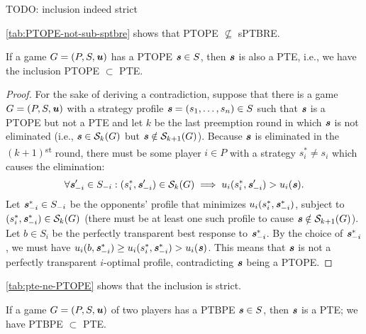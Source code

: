 \begin{remark}
	TODO: inclusion indeed strict
\end{remark}

\begin{remark}
	\autoref{tab:PTOPE-not-sub-sptbre} shows that PTOPE $\not\subseteq$ sPTBRE.
\end{remark}

\begin{lemma}
	\label{th:ptope-subset-pte}
	If a game $G = (P, S, \boldsymbol{\mathit{u}})$ has a PTOPE $\boldsymbol{\mathit{s}} \in S$, then $\boldsymbol{\mathit{s}}$ is also a PTE, i.e., we have the inclusion PTOPE $\subset$ PTE.
\end{lemma}

\begin{proof}
	For the sake of deriving a contradiction, suppose that there is a game $G = (P, S, \boldsymbol{\mathit{u}})$ with a strategy profile $\boldsymbol{\mathit{s}} = (s_1, \dots, s_n) \in S$ such that $\boldsymbol{\mathit{s}}$ is a PTOPE but not a PTE and let $k$ be the last preemption round in which $\boldsymbol{\mathit{s}}$ is not eliminated (i.e., $\boldsymbol{\mathit{s}} \in \mathcal{S}_k(G)$ but $\boldsymbol{\mathit{s}} \notin \mathcal{S}_{k+1}(G)$).
	Because $\boldsymbol{\mathit{s}}$ is eliminated in the $(k+1)$\textsuperscript{st} round, there must be some player $i \in P$ with a strategy $s_i^* \ne s_i$ which causes the elimination:
	\[
		\forall \boldsymbol{\mathit{s}}_{-i}' \in S_{-i}: (s_i^*, \boldsymbol{\mathit{s}}_{-i}') \in \mathcal{S}_k(G) \implies u_i(s_i^*, \boldsymbol{\mathit{s}}_{-i}') > u_i(\boldsymbol{\mathit{s}}).
	\]
	Let $\boldsymbol{\mathit{s}}_{-i}^* \in S_{-i}$ be the opponents' profile that minimizes $u_i(s_i^*, \boldsymbol{\mathit{s}}_{-i}^*)$, subject to $(s_i^*, \boldsymbol{\mathit{s}}_{-i}^*)\in \mathcal{S}_k(G)$ (there must be at least one such profile to cause $\boldsymbol{\mathit{s}} \notin \mathcal{S}_{k+1}(G)$).
	Let $b \in S_i$ be the perfectly transparent best response to $\boldsymbol{\mathit{s}}_{-i}^*$.
	By the choice of $\boldsymbol{\mathit{s}}_{-i}^*$, we must have $u_i(b, \boldsymbol{\mathit{s}}_{-i}^*) \ge u_i(s_i^*, \boldsymbol{\mathit{s}}_{-i}^*) > u_i(\boldsymbol{\mathit{s}})$.
	This means that $\boldsymbol{\mathit{s}}$ is not a perfectly transparent $i$-optimal profile, contradicting $\boldsymbol{\mathit{s}}$ being a PTOPE.
\end{proof}

\begin{remark}
	\autoref{tab:pte-ne-PTOPE} shows that the inclusion is strict.
\end{remark}

\begin{lemma}
	\label{th:ptbpe-subset-pte}
	If a game $G = (P, S, \boldsymbol{\mathit{u}})$ of two players has a PTBPE $\boldsymbol{\mathit{s}} \in S$, then $\boldsymbol{\mathit{s}}$ is a PTE; we have PTBPE $\subset$ PTE.
\end{lemma}

